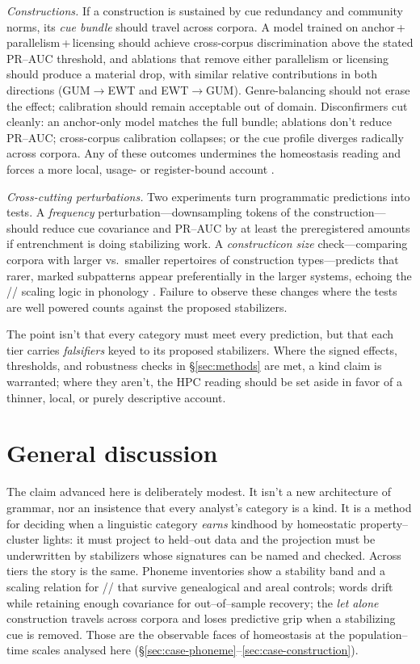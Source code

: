 \documentclass[12pt]{article}
\begin{document}
\emph{Constructions.} If a construction is sustained by cue redundancy and community norms, its \emph{cue bundle} should travel across corpora. A model trained on anchor\,+\,parallelism\,+\,licensing should achieve cross-corpus discrimination above the stated PR–AUC threshold, and ablations that remove either parallelism or licensing should produce a material drop, with similar relative contributions in both directions (GUM$\to$EWT and EWT$\to$GUM). Genre-balancing should not erase the effect; calibration should remain acceptable out of domain. Disconfirmers cut cleanly: an anchor-only model matches the full bundle; ablations don't reduce PR–AUC; cross-corpus calibration collapses; or the cue profile diverges radically across corpora. Any of these outcomes undermines the homeostasis reading and forces a more local, usage- or register-bound account \citep{FillmoreKayOConnor1988,StefanowitschGries2003}.

\emph{Cross-cutting perturbations.} Two experiments turn programmatic predictions into tests. A \emph{frequency} perturbation—downsampling tokens of the construction—should reduce cue covariance and PR–AUC by at least the preregistered amounts if entrenchment is doing stabilizing work. A \emph{constructicon size} check—comparing corpora with larger vs.\ smaller repertoires of construction types—predicts that rarer, marked subpatterns appear preferentially in the larger systems, echoing the // scaling logic in phonology \citep{Ekstrom2025PhonemeTool}. Failure to observe these changes where the tests are well powered counts against the proposed stabilizers.

The point isn't that every category must meet every prediction, but that each tier carries \emph{falsifiers} keyed to its proposed stabilizers. Where the signed effects, thresholds, and robustness checks in \S\ref{sec:methods} are met, a kind claim is warranted; where they aren't, the \textsc{HPC} reading should be set aside in favor of a thinner, local, or purely descriptive account.

\section{General discussion}\label{sec:discussion}

The claim advanced here is deliberately modest. It isn't a new architecture of grammar, nor an insistence that every analyst’s category is a kind. It is a method for deciding when a linguistic category \emph{earns} kindhood by homeostatic property–cluster lights: it must project to held–out data and the projection must be underwritten by stabilizers whose signatures can be named and checked. Across tiers the story is the same. Phoneme inventories show a stability band and a scaling relation for // that survive genealogical and areal controls; words drift while retaining enough covariance for out–of–sample recovery; the \emph{let alone} construction travels across corpora and loses predictive grip when a stabilizing cue is removed. Those are the observable faces of homeostasis at the population–time scales analysed here (\S\ref{sec:case-phoneme}–\ref{sec:case-construction}).
\end{document}
